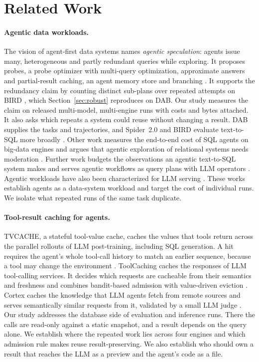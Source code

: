 \section{Related Work}
\label{sec:related}



\paragraph{Agentic data workloads.}
The vision of agent-first data systems names \emph{agentic speculation}: agents issue many, heterogeneous and partly
redundant queries while exploring. It proposes probes, a probe optimizer with multi-query optimization, approximate
answers and partial-result caching, an agent memory store and branching \cite{liu2026overlords}. It supports the
redundancy claim by counting distinct sub-plans over repeated attempts on BIRD \cite{li2023bird}, which
Section~\ref{sec:robust} reproduces on DAB. Our study measures the claim on released multi-model, multi-engine runs
with costs and bytes attached. It also asks which repeats a system could reuse without changing a result. DAB
\cite{ma2026dab} supplies the tasks and trajectories, and Spider~2.0 and BIRD evaluate text-to-SQL more broadly
\cite{lei2025spider2,li2023bird}. Other work measures the end-to-end cost of SQL agents on big-data engines
\cite{eizaguirre2026bigsql} and argues that agentic exploration of relational systems needs moderation
\cite{jivrajani2026sophrosyne}. Further work budgets the observations an agentic text-to-SQL system makes
\cite{peng2026bapsql} and serves agentic workflows as query plans with LLM operators \cite{wadlom2026helium}.
Agentic workloads have also been characterized for LLM serving \cite{chang2026agentic,yuan2026agentic,zhu2026tracelab}.
These works establish agents as a data-system workload and target the cost of individual runs. We isolate what
repeated runs of the same task duplicate.

\paragraph{Tool-result caching for agents.}
TVCACHE, a stateful tool-value cache, caches the values that tools return across the parallel rollouts of LLM
post-training, including SQL generation. A hit requires the agent's whole tool-call history to match an earlier
sequence, because a tool may change the environment \cite{kumar2026tvcache}. ToolCaching caches the responses of LLM
tool-calling services. It decides which requests are cacheable from their semantics and freshness and combines
bandit-based admission with value-driven eviction \cite{zhai2026toolcaching}. Cortex caches the knowledge that LLM
agents fetch from remote sources and serves semantically similar requests from it, validated by a small LLM judge
\cite{ruan2026cortex}. Our study addresses the database side of evaluation and inference runs. There the calls are
read-only against a static snapshot, and a result depends on the query alone. We establish where the repeated work
lies across four engines and which admission rule makes reuse result-preserving. We also establish who should own a
result that reaches the LLM as a preview and the agent's code as a file.

